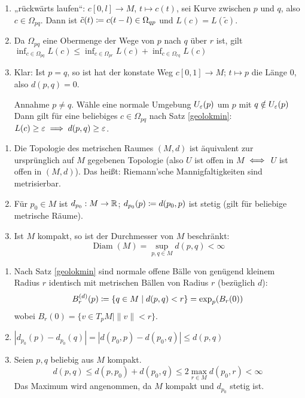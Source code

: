\documentclass[a4paper,twoside,DIV15,BCOR12mm]{scrbook}
\begin{document}
\begin{beweis}
\begin{enumerate}
\item „rückwärts laufen“: $c[0,l]\to M$, $t\mapsto c(t)$, sei Kurve zwischen $p$ und $q$, also $c\in \Omega_{pq}$. Dann ist $\tilde c(t) \da c(t-l) \in \Omega_{qp}$ und $L(c) = L(\tilde c)$.
\item Da $\Omega_{pq}$ eine Obermenge der Wege von $p$ nach $q$ über $r$ ist, gilt $\inf_{c\in\Omega_{pq}} L(c) \le \inf_{c\in\Omega_{pr}} L(c) + \inf_{c\in\Omega_{rq}} L(c)$
\item Klar: Ist $p=q$, so ist hat der konstate Weg $c[0,1]\to M$; $t\mapsto p$ die Länge 0, also $d(p,q)=0$.

Annahme $p\ne q$. Wähle eine normale Umgebung $U_\varepsilon(p)$ um $p$ mit $q\notin U_\varepsilon(p)$ Dann gilt für eine beliebiges $c\in \Omega_{pq}$ nach Satz \ref{geolokmin}: $L(c) \ge \varepsilon \implies d(p,q) \ge \varepsilon$.
\end{enumerate}
\end{beweis}

\begin{korrolar}
\begin{enumerate}
\item  Die Topologie des metrischen Raumes $(M,d)$ ist äquivalent zur ursprünglich auf $M$ gegebenen Topologie (also $U$ ist offen in $M$ $\iff$ $U$ ist offen in $(M,d)$). Das heißt: Riemann’sche Mannigfaltigkeiten sind metrisierbar.
\item Für $p_0\in M$ ist $d_{p_0}: M \to \mathbb{R}$; $d_{p_0}(p) \da d(p_0,p)$ ist stetig (gilt für beliebige metrische Räume).
\item Ist $M$ kompakt, so ist der Durchmesser von $M$ beschränkt: \[ \operatorname{Diam}(M) = \sup_{p,q\in M} d(p,q) < \infty \]
\end{enumerate}
\end{korrolar}

\begin{beweis}
\begin{enumerate}
\item Nach Satz \ref{geolokmin} sind normale offene Bälle von genügend kleinem Radius $r$ identisch mit metrischen Bällen von Radius $r$ (bezüglich $d$):
\[
B_r^{(d)}(p) \da \{q\in M \mid d(p,q) < r\} = \exp_p(B_r(0))
\] wobei $B_r(0) = \{ v\in T_pM \mid \| v\|< r\}$.
\item $|d_{p_0}(p) - d_{p_0}(q)| = |d(p_0,p) - d(p_0,q)| \le d(p,q)$
\item Seien $p,q$ beliebig aus $M$ kompakt.
\[
d(p,q) \le d(p,p_0) + d(p_0,q) \le 2 \max_{r\in M} d(p_0,r) < \infty
\]
Das Maximum wird angenommen, da $M$ kompakt und $d_{p_0}$ stetig ist.
\end{enumerate}
\end{beweis}
\end{document}
